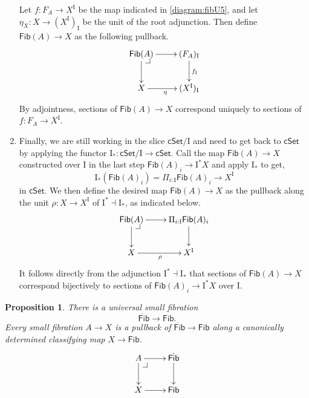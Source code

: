 \documentclass[11pt]{article}
\makeatletter
\newcommand{\cSet}{\ensuremath{\mathsf{cSet}}}
\newcommand{\pbcorner}[1][dr]{\save*!/#1-1.2pc/#1:(-1,1)@^{|-}\restore}
\newcommand{\ra}{\ensuremath{\rightarrow}}
\newcommand{\I}{\ensuremath{\mathrm{I}}}
\newcommand{\Fib}{\ensuremath{\mathsf{Fib}}}
\newcommand{\FFib}{\ensuremath{\dot{\mathsf{Fib}}}}
\newtheorem{proposition}[theorem]{Proposition}
\theoremstyle{remark}
\theoremstyle{definition}
\makeatother
\begin{document}
\begin{enumerate}
Let $f : F_A \ra X^\I$ be the map indicated  in \eqref{diagram:fibU5}, and let $\eta_X : X \ra (X^\I)_\I$ be the unit of the root adjunction.  Then define $\Fib(A)\ra X$ as the following pullback.
\begin{equation}\label{diagram:fibU6}
\xymatrix{
 \Fib(A) \ar[d] \ar[r] \pbcorner & (F_A)_\I \ar[d]^{f_\I}\\
 X \ar[r]_{\eta} &  (X^\I)_\I
}
\end{equation}
By adjointness, sections of $\Fib(A)\ra X$ correspond uniquely to sections of  $f : F_A \ra X^\I$.

\item Finally, we are still working in the slice $\cSet/\I$ and need to get back to $\cSet$ by applying the functor $\I_*: \cSet/\I \ra \cSet$.  Call the map $\Fib(A)\ra X$ constructed over $\I$ in the last step $\Fib(A)_i \ra \I^{*}X$ and apply $\I_*$ to get,
\[
\I_*(\Fib(A)_i) = \Pi_{i:\I}\Fib(A)_i \to X^\I
\]
in $\cSet$.  We then define the desired map $\Fib(A)\ra X$ as the pullback along the unit $\rho : X \ra X^\I$ of  $\I^*\dashv \I_*$, as indicated below.
\begin{equation}\label{diagram:fibU7}
\xymatrix{
 \Fib(A) \ar[d] \ar[r] \pbcorner & \ar[d] \Pi_{i:\I}\Fib(A)_i \\
 X \ar[r]_{\rho} &  X^\I
}
\end{equation}
It follows directly from the adjunction $\I^*\dashv \I_*$ that sections of $\Fib(A)\ra X$ correspond bijectively to sections of $\Fib(A)_i \ra \I^{*}X$ over $\I$.
\end{enumerate}


\begin{proposition}
There is a \emph{universal small fibration}  $$\FFib\ra\Fib.$$  Every small fibration $A \ra X$ is a pullback of $\FFib\ra\Fib$ along a canonically determined classifying map $X\ra \Fib$.
\begin{equation}\label{diagram:classifyfib}
\xymatrix{
A \ar[d] \ar[r]  \pbcorner & \FFib\ar[d]\\
X \ar[r] & \Fib
}
\end{equation}
\end{proposition}
\end{document}
